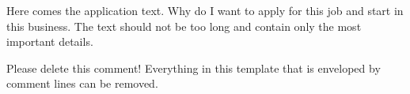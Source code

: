 \documentclass[fontsize=12pt,parskip=half-]{scrartcl}
\begin{document}
\begin{Anschreiben}
    Here comes the application text. Why do I want to apply for this job
    and start in this business. The text should not be too long and contain
    only the most important details.

    Please delete this comment! Everything in this template that is enveloped
    by comment lines can be removed.
\end{Anschreiben}



\MeineSeite



\UeberschriftGroesse{\LARGE}            %


\EinschubCV[buendig]{8pt}            %
\end{document}
